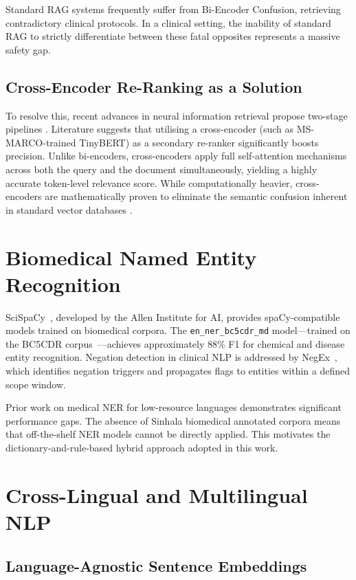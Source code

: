 \documentclass[12pt,a4paper]{report}
\begin{document}
Standard RAG systems frequently suffer from Bi-Encoder Confusion, retrieving contradictory clinical protocols. In a clinical setting, the inability of standard RAG to strictly differentiate between these fatal opposites represents a massive safety gap.

\subsection{Cross-Encoder Re-Ranking as a Solution}

To resolve this, recent advances in neural information retrieval propose two-stage pipelines \cite{Nogueira2019}. Literature suggests that utilising a cross-encoder (such as MS-MARCO-trained TinyBERT) as a secondary re-ranker significantly boosts precision. Unlike bi-encoders, cross-encoders apply full self-attention mechanisms across both the query and the document simultaneously, yielding a highly accurate token-level relevance score. While computationally heavier, cross-encoders are mathematically proven to eliminate the semantic confusion inherent in standard vector databases \cite{Karpukhin2020}.

\section{Biomedical Named Entity Recognition}

SciSpaCy~\cite{Neumann2019}, developed by the Allen Institute for AI, provides spaCy-compatible models trained on biomedical corpora. The \texttt{en\_ner\_bc5cdr\_md} model---trained on the BC5CDR corpus~\cite{Li2016}---achieves approximately 88\% F1 for chemical and disease entity recognition. Negation detection in clinical NLP is addressed by NegEx~\cite{Chapman2001}, which identifies negation triggers and propagates flags to entities within a defined scope window.

Prior work on medical NER for low-resource languages demonstrates significant performance gaps. The absence of Sinhala biomedical annotated corpora means that off-the-shelf NER models cannot be directly applied. This motivates the dictionary-and-rule-based hybrid approach adopted in this work.

\section{Cross-Lingual and Multilingual NLP}

\subsection{Language-Agnostic Sentence Embeddings}
\end{document}

